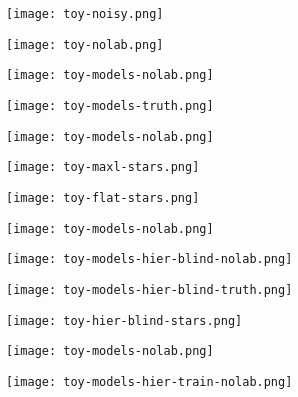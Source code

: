 \documentclass{beamer}
\begin{document}
\begin{frame}
\texttt{[image: toy-noisy.png]}
\end{frame}

\begin{frame}
\texttt{[image: toy-nolab.png]}
\end{frame}

\begin{frame}
\texttt{[image: toy-models-nolab.png]}
\end{frame}

\begin{frame}
\texttt{[image: toy-models-truth.png]}
\end{frame}

\begin{frame}
\texttt{[image: toy-models-nolab.png]}
\end{frame}

\begin{frame}
\texttt{[image: toy-maxl-stars.png]}
\end{frame}

\begin{frame}
\texttt{[image: toy-flat-stars.png]}
\end{frame}

\begin{frame}
\texttt{[image: toy-models-nolab.png]}
\end{frame}

\begin{frame}
\texttt{[image: toy-models-hier-blind-nolab.png]}
\end{frame}

\begin{frame}
\texttt{[image: toy-models-hier-blind-truth.png]}
\end{frame}

\begin{frame}
\texttt{[image: toy-hier-blind-stars.png]}
\end{frame}

\begin{frame}
\texttt{[image: toy-models-nolab.png]}
\end{frame}

\begin{frame}
\texttt{[image: toy-models-hier-train-nolab.png]}
\end{frame}
\end{document}
